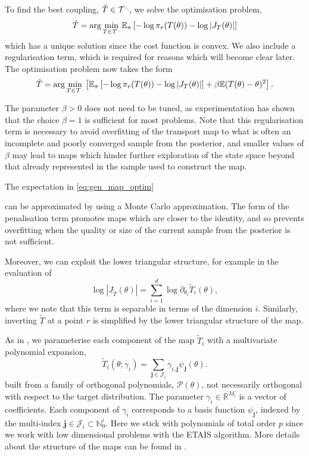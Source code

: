 \documentclass[final]{siamltex}
\newcommand{\edit}[1]{{\color{red} #1}}
\newcommand{\ltri}{%
\,\resizebox{!}{0.25\baselineskip}{%
\begin{tikzpicture}%
\draw[line width=1mm](0,0) -- (0,2) -- (2,0)  -- (0,0);
\end{tikzpicture}%
}\xspace%
}%
\newcommand{\smallltri}{%
\,\resizebox{!}{0.15\baselineskip}{%
\begin{tikzpicture}%
\draw[line width=1mm](0,0) -- (0,2) -- (2,0)  -- (0,0);
\end{tikzpicture}%
}\xspace%
}%
\begin{document}
To find the best coupling, $\tilde{T} \in \mathcal{T}^{\ltri}$, we solve the optimisation problem,
\begin{equation}
	\tilde{T} = \arg\min_{T \in \mathcal{T}^{\smallltri}} \mathbb{E}_\pi\left[-\log\pi_r(T(\theta)) -
		\log\left|J_T(\theta)\right|\right]
\end{equation}
which has a unique solution since the cost function is convex. We also include a regularisation term, which is required for reasons which will become clear later. The optimisation problem now takes the form
\begin{equation}\label{eq:gen_map_optim}
	\tilde{T} = \arg\min_{T\in\mathcal{T}^{\smallltri}} \left[
		 \mathbb{E}_\pi\left[-\log\pi_r(T(\theta)) -
		\log\left|J_T(\theta)\right|\right] + \beta\mathbb{E}(T(\theta)- \theta)^2 \right].
\end{equation}
\edit{The parameter $\beta>0$ does not need to be tuned, as experimentation has shown that the choice
$\beta=1$ is sufficient for most problems. Note that this
regularisation term is necessary to avoid overfitting of the transport
map to what is often an incomplete and poorly converged sample from
the posterior, and smaller values of $\beta$ may lead to maps which
hinder further exploration of the state space beyond that already
represented in the sample used to construct the map.

The expectation in \eqref{eq:gen_map_optim}} can be
approximated by using a Monte Carlo approximation. The form of the penalisation term promotes maps which are
closer to the identity, and so prevents overfitting when the quality
or size of the current sample from the posterior is not
sufficient. \edit{Moreover, we can exploit the lower triangular
  structure, for example in the evaluation of 
\begin{equation}\label{eqn:separable_jacobian}
	\log\left|J_{\tilde{T}}(\theta)\right| = \sum\limits_{i=1}^d \! \log \partial_{\theta_i} \tilde{T}_i(\theta),
\end{equation}
where we note that this term is separable in terms of the dimension
$i$. Similarly, inverting $\tilde{T}$ at a point $r$ is simplified by the lower triangular structure of the map.

As in \cite{parno2018transport}, we parameterise each component of the
map $\tilde{T}_i$ with a multivariate polynomial expansion,
\begin{equation}\label{eq:map_defn}
	\tilde{T}_i(\theta; \gamma_i) = \sum\limits_{\mathbf{j}\in\mathcal{J}_i} \!
\gamma_{i,\mathbf{j}}\psi_\mathbf{j}(\theta).
\end{equation}
built from
a family of orthogonal polynomials, $\mathcal{P}(\theta)$, not
necessarily orthogonal with respect to the target distribution. The parameter $\gamma_i \in \mathbb{R}^{M_i}$ is a vector of coefficients. Each component of $\gamma_i$ corresponds to a basis function
$\psi_\mathbf{j}$, indexed by the multi-index $\mathbf{j} \in
\mathcal{J}_i \subset \mathbb{N}_0^i$. 
Here we stick with polynomials of total order $p$ since we work with
low dimensional problems with the ETAIS algorithm. More details about
the structure of the maps can be found in  \cite{parno2018transport}.}
\end{document}
